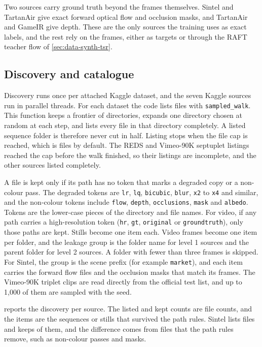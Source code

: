 Two sources carry ground truth beyond the frames themselves. Sintel and TartanAir give exact forward optical flow and occlusion masks, and TartanAir and GameIR give depth. These are the only sources the training uses as exact labels, and the rest rely on the frames, either as targets or through the RAFT teacher flow of \cref{sec:data-synth-tsr}.

\subsection{Discovery and catalogue}\label{sec:data-discovery}

Discovery runs once per attached Kaggle dataset, and the seven Kaggle sources run in parallel threads. For each dataset the code lists files with \texttt{sampled\_walk}. This function keeps a frontier of directories, expands one directory chosen at random at each step, and lists every file in that directory completely. A listed sequence folder is therefore never cut in half. Listing stops when the file cap is reached, which is  files by default. The REDS and Vimeo-90K septuplet listings reached the cap before the walk finished, so their listings are incomplete, and the other sources listed completely.

A file is kept only if its path has no token that marks a degraded copy or a non-colour pass. The degraded tokens are \texttt{lr}, \texttt{lq}, \texttt{bicubic}, \texttt{blur}, \texttt{x2} to \texttt{x4} and similar, and the non-colour tokens include \texttt{flow}, \texttt{depth}, \texttt{occlusions}, \texttt{mask} and \texttt{albedo}. Tokens are the lower-case pieces of the directory and file names. For video, if any path carries a high-resolution token (\texttt{hr}, \texttt{gt}, \texttt{original} or \texttt{groundtruth}), only those paths are kept. Stills become one item each. Video frames become one item per folder, and the leakage group is the folder name for level 1 sources and the parent folder for level 2 sources. A folder with fewer than three frames is skipped. For Sintel, the group is the scene prefix (for example \texttt{market}), and each item carries the forward flow files and the occlusion masks that match its frames. The Vimeo-90K triplet clips are read directly from the official test list, and up to 1,000 of them are sampled with the seed.

 reports the discovery per source. The listed and kept counts are file counts, and the items are the sequences or stills that survived the path rules. Sintel lists  files and keeps  of them, and the difference comes from files that the path rules remove, such as non-colour passes and masks. \Preliminary

